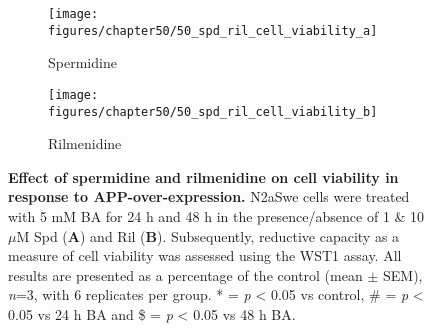 \begin{figure}[!htbp]
  \centering
  \begin{subfigure}[b]{0.495\linewidth}
    \texttt{[image: figures/chapter50/50\_spd\_ril\_cell\_viability\_a]}
    \caption{Spermidine}
  \end{subfigure}
  \begin{subfigure}[b]{0.495\linewidth}
    \texttt{[image: figures/chapter50/50\_spd\_ril\_cell\_viability\_b]}
    \caption{Rilmenidine}
  \end{subfigure}
  \caption[Effect of spermidine and rilmenidine on cell viability in response to APP-over-expression]{\textbf{Effect of spermidine and rilmenidine on cell viability in response to APP-over-expression.} N2aSwe cells were treated with 5 mM BA for 24 h and 48 h in the presence/absence of 1 \& 10 $\mu$M Spd (\textbf{A}) and Ril (\textbf{B}). Subsequently, reductive capacity as a measure of cell viability was assessed using the WST1 assay. All results are presented as a percentage of the control (mean $\pm$ SEM), \textit{n}=3, with 6 replicates per group. * = \textit{p} < 0.05 vs control, \# = \textit{p} < 0.05 vs 24 h BA and \$ = \textit{p} < 0.05 vs 48 h BA.}
  \label{fig:50_spd_ril_cell_viability_a}
\end{figure}

